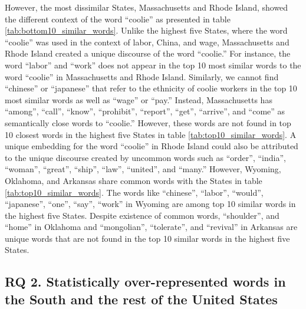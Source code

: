 \documentclass[11pt]{article}
\begin{document}
However, the most dissimilar States, Massachusetts and Rhode Island, showed the different context of the word ``coolie''
as presented in table \ref{tab:bottom10_similar_words}. Unlike the highest five States, where the word ``coolie'' was used in the context of
labor, China, and wage, Massachusetts and Rhode Island created a unique discourse of the word ``coolie.''
For instance, the word ``labor'' and ``work'' does not appear in the top 10 most similar words to the word ``coolie'' in Massachusetts and Rhode Island.
Similarly, we cannot find ``chinese'' or ``japanese'' that refer to the ethnicity of coolie workers in the top 10 most similar words as well as ``wage'' or ``pay.''
Instead, Massachusetts has ``among'', ``call'', ``know'', ``prohibit'', ``report'', ``get'', ``arrive'', and ``come'' as
semantically close words to ``coolie.'' However, these words are not found in top 10 closest words in the highest five States in table \ref{tab:top10_similar_words}.
A unique embedding for the word ``coolie'' in Rhode Island could also be attributed to the unique discourse created by uncommon words
such as ``order'', ``india'', ``woman'', ``great'', ``ship'', ``law'', ``united'', and ``many.''
However, Wyoming, Oklahoma, and Arkansas share common words with the States in table \ref{tab:top10_similar_words}. 
The words like ``chinese'', ``labor'', ``would'', ``japanese'', ``one'', ``say'', ``work'' in Wyoming are among top 10 similar words in
the highest five States. Despite existence of common words, ``shoulder'', and ``home'' in Oklahoma and ``mongolian'', ``tolerate'', and ``revival''
in Arkansas are unique words that are not found in the top 10 similar words in the highest five States.


\subsection{RQ 2. Statistically over-represented words in the South and the rest of the United States} \label{sec:result_rq2_overrepresented_words}
\end{document}

